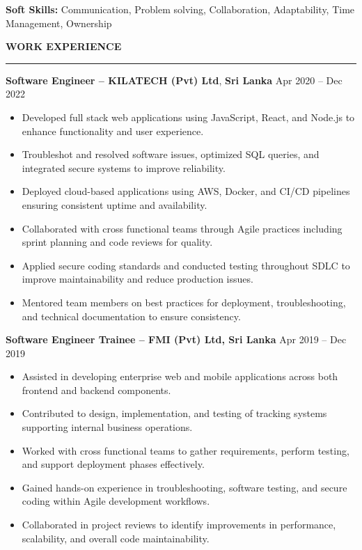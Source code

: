 \documentclass[10pt,letterpaper]{article}
\begin{document}
\textbf{Soft Skills:} Communication, Problem solving, Collaboration, Adaptability, Time Management, Ownership

\vspace{8pt}

\textbf{WORK EXPERIENCE}\\[-8pt]
\noindent\rule{\textwidth}{1pt}

\vspace{-2pt}

\textbf{Software Engineer -- KILATECH (Pvt) Ltd}, \textbf{Sri Lanka} \hfill Apr 2020 -- Dec 2022

\vspace{-1pt}

\begin{itemize}
\item Developed full stack web applications using JavaScript, React, and Node.js to enhance functionality and user experience.
\item Troubleshot and resolved software issues, optimized SQL queries, and integrated secure systems to improve reliability.
\item Deployed cloud-based applications using AWS, Docker, and CI/CD pipelines ensuring consistent uptime and availability.
\item Collaborated with cross functional teams through Agile practices including sprint planning and code reviews for quality.
\item Applied secure coding standards and conducted testing throughout SDLC to improve maintainability and reduce production issues.
\item Mentored team members on best practices for deployment, troubleshooting, and technical documentation to ensure consistency.
\end{itemize}

\textbf{Software Engineer Trainee -- FMI (Pvt) Ltd, Sri Lanka} \hfill Apr 2019 -- Dec 2019

\vspace{-1pt}

\begin{itemize}
\item Assisted in developing enterprise web and mobile applications across both frontend and backend components.
\item Contributed to design, implementation, and testing of tracking systems supporting internal business operations.
\item Worked with cross functional teams to gather requirements, perform testing, and support deployment phases effectively.
\item Gained hands-on experience in troubleshooting, software testing, and secure coding within Agile development workflows.
\item Collaborated in project reviews to identify improvements in performance, scalability, and overall code maintainability.
\end{itemize}
\end{document}
